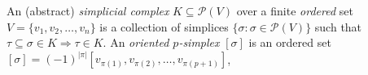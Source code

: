 An (abstract) \emph{simplicial complex} $K \subseteq \mathcal{P}(V)$ over a finite \emph{ordered} set $V = \{v_1, v_2, \dots, v_n \}$ is a collection of simplices $\{\sigma : \sigma \in \mathcal{P}(V) \}$ such that $\tau \subseteq \sigma \in K \Rightarrow \tau \in K$.
An \emph{oriented $p$-simplex} $[\sigma]$ is an ordered set $[\sigma] = (-1)^{\lvert \pi \rvert } \left [v_{\pi(1)}, v_{\pi(2)}, \dots, v_{\pi(p+1)} \right ]$,
